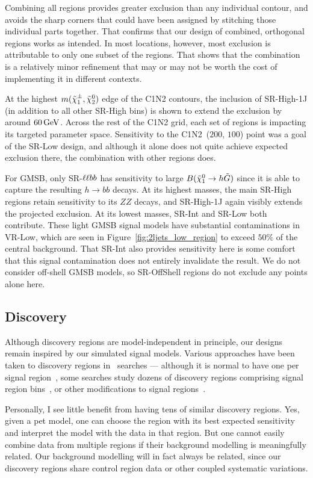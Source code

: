 Combining all regions provides greater exclusion than any individual contour,
and avoids the sharp corners that could have been assigned by stitching those
individual parts together.
That confirms that our design of combined, orthogonal regions works as
intended.
In most locations, however, most exclusion is attributable to only one subset
of the regions.
That shows that the combination is a relatively minor refinement that may or
may not be worth the cost of implementing it in different contexts.

At the highest $m(\chargino_1,\neutralino_2)$ edge of the C1N2 contours,
the inclusion of SR-High-1J (in addition to all other SR-High bins) is shown
to extend the exclusion by around $60\,\eV[G]$.
Across the rest of the C1N2 grid, each set of regions is impacting its targeted
parameter space.
Sensitivity to the C1N2~($200$, $100$) point was a goal of the SR-Low design,
and although it alone does not quite achieve expected exclusion there, the
combination with other regions does.

For GMSB, only SR-$\llbb$ has sensitivity to large
$B(\neutralino_1 \to h \tilde{G})$ since it is able to capture the
resulting $h\to bb$ decays.
At its highest masses, the main SR-High regions retain sensitivity to its
$ZZ$ decays, and SR-High-1J again visibly extends the projected exclusion.
At its lowest masses, SR-Int and SR-Low both contribute.
These light GMSB signal models have substantial contaminations in VR-Low, which
are seen in Figure~\ref{fig:2ljets_low_region} to exceed $50\%$ of the central
background.
That SR-Int also provides sensitivity here is some comfort that this signal
contamination does not entirely invalidate the result.
We do not consider off-shell GMSB models, so SR-OffShell regions do not exclude
any points alone here.


\subsection{Discovery}
\label{sec:2ljets_disco}
Although discovery regions are model-independent in principle, our designs
remain inspired by our simulated signal models.
Various approaches have been taken to discovery regions in \atlas\ searches
--- although it is normal to have one per signal region~\cite{SUSY-2018-02},
some searches study dozens of discovery regions comprising signal region
bins~\cite{SUSY-2018-36}, or other modifications to signal
regions~\cite{atlas_susy_compressed_2l_2018_run2}.

Personally, I see little benefit from having tens of similar discovery regions.
Yes, given a pet model, one can choose the region with its best expected
sensitivity and interpret the model with the data in that region.
But one cannot easily combine data from multiple regions if their background
modelling is meaningfully related.
Our background modelling will in fact always be related, since our discovery
regions share control region data or other coupled systematic variations.

